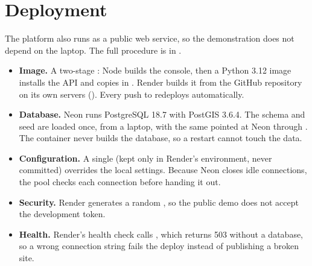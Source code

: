 \documentclass[11pt,a4paper]{article}
\begin{document}
\section{Deployment}\label{sec:deploy}

The platform also runs as a public web service, so the demonstration does not depend on
the laptop. The full procedure is in .

\begin{center}
\end{center}

\begin{itemize}
  \item \textbf{Image.} A two-stage : Node builds the console, then a
    Python 3.12 image installs the API and copies in . Render builds it from
    the GitHub repository on its own servers (). Every push to
     redeploys automatically.
  \item \textbf{Database.} Neon runs PostgreSQL 18.7 with PostGIS 3.6.4. The schema
    and seed are loaded once, from a laptop, with the same 
    pointed at Neon through . The container never builds the database,
    so a restart cannot touch the data.
  \item \textbf{Configuration.} A single  (kept only in Render's
    environment, never committed) overrides the local  settings. Because Neon
    closes idle connections, the pool checks each connection before handing it out.
  \item \textbf{Security.} Render generates a random , so the public
    demo does not accept the development token.
  \item \textbf{Health.} Render's health check calls , which returns 503
    without a database, so a wrong connection string fails the deploy instead of
    publishing a broken site.
\end{itemize}
\end{document}
